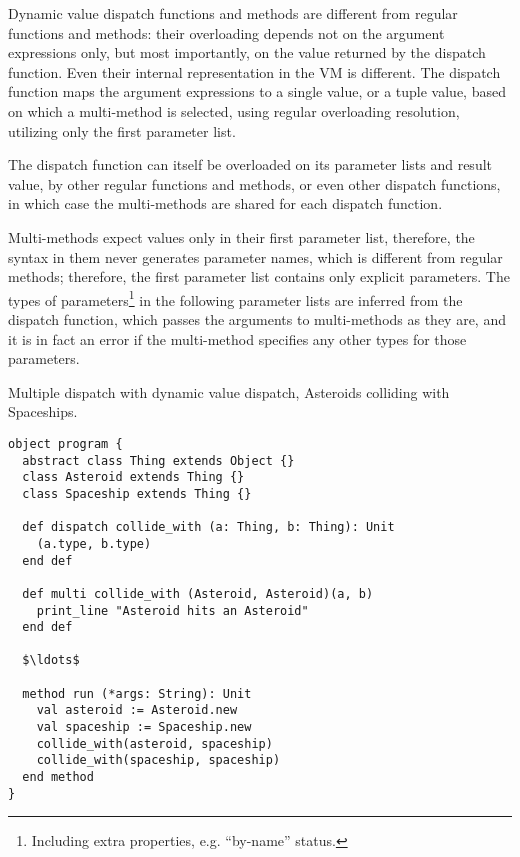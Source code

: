 Dynamic value dispatch functions and methods are different from regular functions and methods: their overloading depends not on the argument expressions only, but most importantly, on the value returned by the dispatch function. Even their internal representation in the VM is different. The dispatch function maps the argument expressions to a single value, or a tuple value, based on which a multi-method is selected, using regular overloading resolution, utilizing only the first parameter list.

The dispatch function can itself be overloaded on its parameter lists and result value, by other regular functions and methods, or even other dispatch functions, in which case the multi-methods are shared for each dispatch function. 

Multi-methods expect values only in their first parameter list, therefore, the syntax in them never generates parameter names, which is different from regular methods; therefore, the first parameter list contains only explicit parameters. The types of parameters\footnote{Including extra properties, e.g. ``by-name'' status.} in the following parameter lists are inferred from the dispatch function, which passes the arguments to multi-methods as they are, and it is in fact an error if the multi-method specifies any other types for those parameters. 

\example Multiple dispatch with dynamic value dispatch, Asteroids colliding with Spaceships.
\begin{lstlisting}
object program {
  abstract class Thing extends Object {}
  class Asteroid extends Thing {}
  class Spaceship extends Thing {}
  
  def dispatch collide_with (a: Thing, b: Thing): Unit
    (a.type, b.type)
  end def
  
  def multi collide_with (Asteroid, Asteroid)(a, b)
    print_line "Asteroid hits an Asteroid"
  end def
  
  $\ldots$
  
  method run (*args: String): Unit
    val asteroid := Asteroid.new
    val spaceship := Spaceship.new
    collide_with(asteroid, spaceship)
    collide_with(spaceship, spaceship)
  end method
}
\end{lstlisting}


